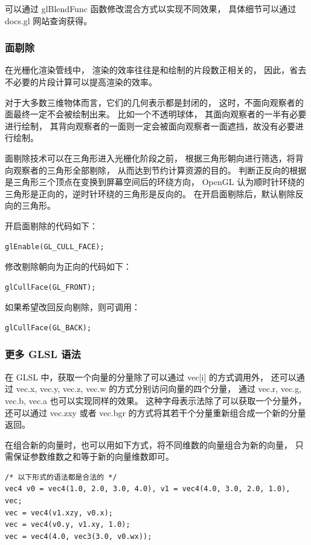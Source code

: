 \documentclass[fontset=windows]{ctexart}
\begin{document}
可以通过 glBlendFunc 函数修改混合方式以实现不同效果，
具体细节可以通过 docs.gl 网站查询获得。

\subsubsection{面剔除}

在光栅化渲染管线中，
渲染的效率往往是和绘制的片段数正相关的，
因此，省去不必要的片段计算可以提高渲染的效率。

对于大多数三维物体而言，它们的几何表示都是封闭的，
这时，不面向观察者的面最终一定不会被绘制出来。
比如一个不透明球体，
其面向观察者的一半有必要进行绘制，
其背向观察者的一面则一定会被面向观察者一面遮挡，故没有必要进行绘制。

面剔除技术可以在三角形进入光栅化阶段之前，
根据三角形朝向进行筛选，将背向观察者的三角形全部剔除，
从而达到节约计算资源的目的。
判断正反向的根据是三角形三个顶点在变换到屏幕空间后的环绕方向，
OpenGL 认为顺时针环绕的三角形是正向的，逆时针环绕的三角形是反向的。
在开启面剔除后，默认剔除反向的三角形。

开启面剔除的代码如下：

\begin{lstlisting}
glEnable(GL_CULL_FACE);
\end{lstlisting}

修改剔除朝向为正向的代码如下：

\begin{lstlisting}
glCullFace(GL_FRONT);
\end{lstlisting}

如果希望改回反向剔除，则可调用：

\begin{lstlisting}
glCullFace(GL_BACK);
\end{lstlisting}


\subsubsection{更多 GLSL 语法}

在 GLSL 中，获取一个向量的分量除了可以通过 vec[i] 的方式调用外，
还可以通过 vec.x, vec.y, vec.z, vec.w 的方式分别访问向量的四个分量，
通过 vec.r, vec.g, vec.b, vec.a 也可以实现同样的效果。
这种字母表示法除了可以获取一个分量外，
还可以通过 vec.zxy 或者 vec.bgr 的方式将其若干个分量重新组合成一个新的分量返回。

在组合新的向量时，也可以用如下方式，将不同维数的向量组合为新的向量，
只需保证参数维数之和等于新的向量维数即可。

\begin{lstlisting}
/* 以下形式的语法都是合法的 */
vec4 v0 = vec4(1.0, 2.0, 3.0, 4.0), v1 = vec4(4.0, 3.0, 2.0, 1.0), vec;
vec = vec4(v1.xzy, v0.x);
vec = vec4(v0.y, v1.xy, 1.0);
vec = vec4(4.0, vec3(3.0, v0.wx));
\end{lstlisting}
\end{document}
